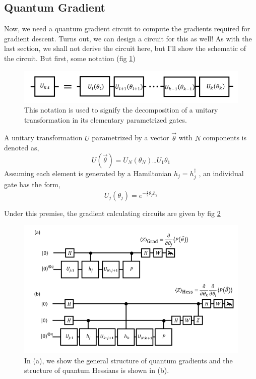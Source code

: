 \documentclass[conference]{IEEEtran}
\begin{document}
\subsection{Quantum Gradient}
Now, we need a quantum gradient circuit to compute the gradients required for gradient descent. Turns out, we can design a circuit for this as well!
As with the last section, we shall not derive the circuit here, but I'll show the schematic of the circuit. But first, some notation (fig \ref{u-decomp})

\begin{figure}[htbp]
\centerline{\includegraphics[scale = 0.4]{Images/unitary-decomp.png}}
\caption{This notation is used to signify the decomposition
of a unitary transformation in its elementary parametrized
gates.}
\label{u-decomp}
\end{figure}

A unitary transformation $U$ parametrized by a
vector $\vec{\theta}$ with $N$ components is denoted as,
\begin{equation*}
    U(\vec{\theta}) = U_N(\theta_N) {}_{\cdots} U_1{\theta_1}
\end{equation*}
Assuming each element is generated by a Hamiltonian
$h_j = h^{\dag}_j$ , an individual gate has the form,
\begin{equation*}
    U_{j}(\theta_j) = e^{-\frac{i}{2}\theta_j h_j}
\end{equation*}

Under this premise, the gradient calculating circuits are given by fig \ref{q-grad}
\begin{figure}[htbp]
\centerline{\includegraphics[scale = 0.4]{Images/q-grad.png}}
\caption{In (a), we show the general structure of quantum
gradients and the structure of quantum Hessians is shown in
(b).}
\label{q-grad}
\end{figure}
\end{document}
